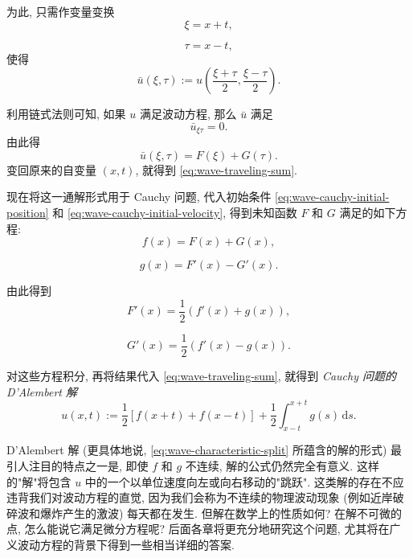 为此, 只需作变量变换
\begin{equation}\label{eq:wave-characteristic-xi}
\xi=x+t,
\end{equation}

\begin{equation}\label{eq:wave-characteristic-tau}
\tau=x-t,
\end{equation}
使得
\begin{equation}\label{eq:wave-transformed-function}
\bar u(\xi,\tau):=u\left(\dfrac{\xi+\tau}{2},\dfrac{\xi-\tau}{2}\right).
\end{equation}


利用链式法则可知, 如果 $u$ 满足波动方程, 那么 $\bar u$ 满足
\begin{equation}\label{eq:wave-mixed-derivative-zero}
\bar u_{\xi\tau}=0.
\end{equation}
由此得
\begin{equation}\label{eq:wave-characteristic-split}
\bar u(\xi,\tau)=F(\xi)+G(\tau).
\end{equation}
变回原来的自变量 $(x,t)$, 就得到 \eqref{eq:wave-traveling-sum}.

现在将这一通解形式用于 Cauchy 问题, 代入初始条件 \eqref{eq:wave-cauchy-initial-position} 和 \eqref{eq:wave-cauchy-initial-velocity}, 得到未知函数 $F$ 和 $G$ 满足的如下方程:
\begin{equation}\label{eq:dalembert-initial-position-relation}
f(x)=F(x)+G(x),
\end{equation}

\begin{equation}\label{eq:dalembert-initial-velocity-relation}
g(x)=F'(x)-G'(x).
\end{equation}


由此得到
\begin{equation}\label{eq:dalembert-f-derivative}
F'(x)=\dfrac12(f'(x)+g(x)),
\end{equation}

\begin{equation}\label{eq:dalembert-g-derivative}
G'(x)=\dfrac12(f'(x)-g(x)).
\end{equation}


对这些方程积分, 再将结果代入 \eqref{eq:wave-traveling-sum}, 就得到 \emph{Cauchy 问题的 D'Alembert 解}
\begin{equation}\label{eq:dalembert-cauchy-solution}
u(x,t):=\dfrac12[f(x+t)+f(x-t)]+\dfrac12\int_{x-t}^{x+t}g(s)\,\mathrm{d}s.
\end{equation}


D'Alembert 解 (更具体地说, \eqref{eq:wave-characteristic-split} 所蕴含的解的形式) 最引人注目的特点之一是, 即使 $f$ 和 $g$ 不连续, 解的公式仍然完全有意义. 这样的"解"将包含 $u$ 中的一个以单位速度向左或向右移动的"跳跃". 这类解的存在不应违背我们对波动方程的直觉, 因为我们会称为不连续的物理波动现象 (例如近岸破碎波和爆炸产生的激波) 每天都在发生. 但解在数学上的性质如何? 在解不可微的点, 怎么能说它满足微分方程呢? 后面各章将更充分地研究这个问题, 尤其将在广义波动方程的背景下得到一些相当详细的答案.

